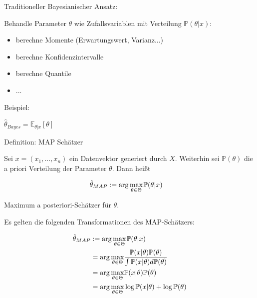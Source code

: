 \documentclass{beamer}
\begin{document}
{\begin{frame}{Traditioneller Bayesianischer Ansatz:}

Behandle Parameter $\theta$ wie Zufallsvariablen mit Verteilung $\mathbb{P}(\theta \vert x)$:\\
\begin{itemize}
	\item berechne Momente (Erwartungswert, Varianz...)
	\item berechne Konfidenzintervalle
	\item berechne Quantile
	\item ...
\end{itemize}
Beispiel:
\begin{center}
$\hat{\theta}_{Bayes} = \mathbb{E}_{\theta \vert x}[\theta]$
\end{center}


\end{frame}



\begin{frame}
\begin{block}{Definition: MAP Schätzer}

Sei $x= (x_1,\dots,x_n)$ ein Datenvektor generiert durch $X$. Weiterhin sei $\mathbb{P}(\theta)$ die a priori Verteilung der Parameter $\theta$. Dann heißt

\begin{align}
\hat{\theta}_{MAP} & := \arg\underset{\theta \in \Theta}{\max}\hspace{0.3mm} \mathbb{P}(\theta \vert x)
\end{align}


Maximum a posteriori-Schätzer für $\theta$.
\end{block}
\end{frame}


\begin{frame}

Es gelten die folgenden Transformationen des MAP-Schätzers:

\begin{align}
\hat{\theta}_{MAP} & := \arg\underset{\theta \in \Theta}{\max}\hspace{0.3mm} \mathbb{P}(\theta \vert x) \\ & =  
 \arg\underset{\theta \in \Theta}{\max} \frac{ \mathbb{P}(x\vert\theta) \mathbb{P}(\theta)}{\int  \mathbb{P}(x\vert \theta) d\mathbb{P}(\theta)}\\
 & = \arg\underset{\theta \in \Theta}{\max}  \mathbb{P}(x\vert \theta) \mathbb{P}(\theta) \\
 & = \arg\underset{\theta \in \Theta}{\max} \log\mathbb{P}(x\vert \theta) + \log \mathbb{P}(\theta)
\end{align}


\end{frame}}
\end{document}
